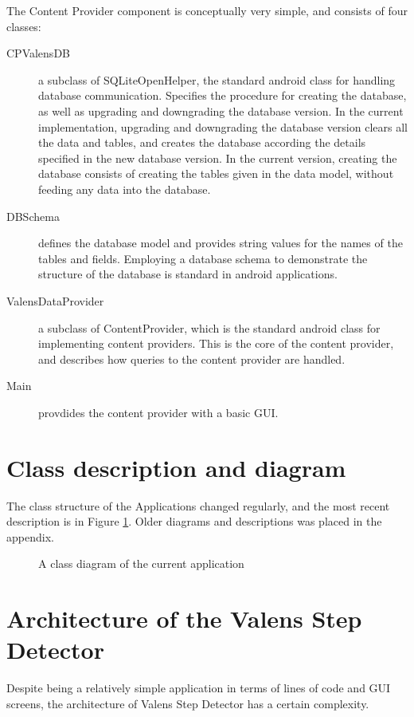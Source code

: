The Content Provider component is conceptually very simple, and consists of four classes:
\begin{description}
\item[CPValensDB]
a subclass of SQLiteOpenHelper, the standard android class for handling database communication. Specifies the procedure for creating the database, as well as upgrading and downgrading the database version. In the current implementation, upgrading and downgrading the database version clears all the data and tables, and creates the database according the details specified in the new database version. In the current version, creating the database consists of creating the tables given in the data model, without feeding any data into the database.
\item[DBSchema]
defines the database model and provides string values for the names of the tables and fields. Employing a database schema to demonstrate the structure of the database is standard in android applications.
\item[ValensDataProvider]
a subclass of ContentProvider, which is the standard android class for implementing content providers. This is the core of the content provider, and describes how queries to the content provider are handled.
\item[Main]
provdides the content provider with a basic GUI.
\end{description}


\section{Class description and diagram}

The class structure of the Applications changed regularly, and the most recent description is in Figure \ref{fig:ClassDiagram}. Older diagrams and descriptions was placed in the appendix. 
\begin{figure}[p]
\label{fig:ClassDiagram}

\setlength\fboxsep{0pt}
\setlength\fboxrule{1pt}
\caption{A class diagram of the current application}
\end{figure}

\section{Architecture of the Valens Step Detector}

Despite being a relatively simple application in terms of lines of code and GUI screens, the architecture of Valens Step Detector has a certain complexity.
